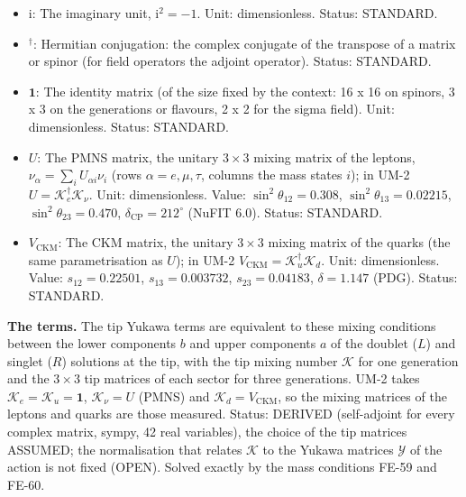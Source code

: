 \documentclass[
  10pt,
]{article}
\begin{document}
\begin{itemize}
  block of the reduction (a function of \(y\) and \(x_4\)),
  \(\chi = (\chi_1, \chi_2)^T = (a, \mathrm{i}b)^T\); \(\chi_o\) the
  Kohn-Sham orbital \(o\), normalised as
  \(\int_{-L}^{0}\chi_o^\dagger\chi_o\,\mathrm{d}y = 1\). Unit:
  \(\mathrm{GeV}^{1/2}\) (normalised orbital). Status: DERIVED.
\item
  \(\mathrm{i}\): The imaginary unit, \(\mathrm{i}^2 = -1\). Unit:
  dimensionless. Status: STANDARD.
\item
  \({}^\dagger\): Hermitian conjugation: the complex conjugate of the
  transpose of a matrix or spinor (for field operators the adjoint
  operator). Status: STANDARD.
\item
  \(\mathbf{1}\): The identity matrix (of the size fixed by the context:
  16 x 16 on spinors, 3 x 3 on the generations or flavours, 2 x 2 for
  the sigma field). Unit: dimensionless. Status: STANDARD.
\item
  \(U\): The PMNS matrix, the unitary \(3 \times 3\) mixing matrix of
  the leptons, \(\nu_\alpha = \sum_iU_{\alpha i}\nu_i\) (rows
  \(\alpha = e, \mu, \tau\), columns the mass states \(i\)); in UM-2
  \(U = \mathcal{K}_e^\dagger\mathcal{K}_\nu\). Unit: dimensionless.
  Value: \(\sin^2\theta_{12} = 0.308\), \(\sin^2\theta_{13} = 0.02215\),
  \(\sin^2\theta_{23} = 0.470\), \(\delta_{\mathrm{CP}} = 212^\circ\)
  (NuFIT 6.0). Status: STANDARD.
\item
  \(V_{\mathrm{CKM}}\): The CKM matrix, the unitary \(3 \times 3\)
  mixing matrix of the quarks (the same parametrisation as \(U\)); in
  UM-2 \(V_{\mathrm{CKM}} = \mathcal{K}_u^\dagger\mathcal{K}_d\). Unit:
  dimensionless. Value: \(s_{12} = 0.22501\), \(s_{13} = 0.003732\),
  \(s_{23} = 0.04183\), \(\delta = 1.147\) (PDG). Status: STANDARD.
\end{itemize}

\textbf{The terms.} The tip Yukawa terms are equivalent to these mixing
conditions between the lower components \(b\) and upper components \(a\)
of the doublet (\(L\)) and singlet (\(R\)) solutions at the tip, with
the tip mixing number \(\mathcal{K}\) for one generation and the
\(3 \times 3\) tip matrices of each sector for three generations. UM-2
takes \(\mathcal{K}_e = \mathcal{K}_u = \mathbf{1}\),
\(\mathcal{K}_\nu = U\) (PMNS) and \(\mathcal{K}_d = V_{\mathrm{CKM}}\),
so the mixing matrices of the leptons and quarks are those measured.
Status: DERIVED (self-adjoint for every complex matrix, sympy, 42 real
variables), the choice of the tip matrices ASSUMED; the normalisation
that relates \(\mathcal{K}\) to the Yukawa matrices \(\mathcal{Y}\) of
the action is not fixed (OPEN). Solved exactly by the mass conditions
FE-59 and FE-60.
\end{document}

